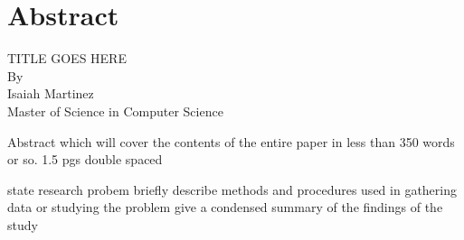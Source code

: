 \chapter*{\normalfont Abstract}\label{chapter:Abstract}

    \begin{center}
        TITLE GOES HERE\\
        \vspace{0.15in}
        By\\
        \vspace{0.15in}
        Isaiah Martinez\\
        \vspace{0.3in}
        Master of Science in Computer Science\\
        \vspace{0.15in}
    \end{center}

    \begin{center}
        Abstract which will cover the contents of the entire paper in less than 350 words or so.
        1.5 pgs double spaced

        state research probem briefly
        describe methods and procedures used in gathering data or studying the problem
        give a condensed summary of the findings of the study
    \end{center}
